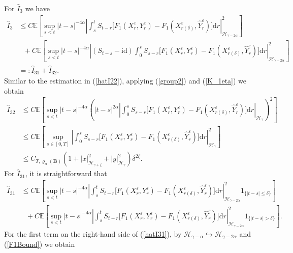 \documentclass[10pt,a4paper]{article}
\numberwithin{equation}{section}
\begin{document}
For $\hat{I}_3$ we have
\begin{align*}
\hat{I}_3 & \leq C   \mathbb E \left [ \sup_{s<t} |t-s|^{-4\alpha} \left| \int_s^t S_{t-r}\big[ F_1(X_r^\varepsilon,Y_r^\varepsilon)-F_1(X_{r(\delta)}^\varepsilon,\hat{Y}_r^\varepsilon) \big]\mathrm{d} r \right|_{\mathcal H_{\gamma-2\alpha} }^2 \right ] \nonumber\\
	&~~~+C \mathbb E \left [ \sup_{s<t} |t-s|^{-4\alpha} \left| (S_{t-s}-\mathrm{\mathrm{id} })\int_0^s S_{s-r}\big[F_1(X_r^\varepsilon,Y_r^\varepsilon)-F_1(X_{r(\delta)}^\varepsilon,\hat{Y}_r^\varepsilon) \big] \mathrm{d} r \right|_{\mathcal H_{\gamma-2\alpha} }^2 \right ] \nonumber\\
	&=: \hat{I}_{31}+\hat{I}_{32}.	
\end{align*}
Similar to the estimation in (\ref{hatI22}), applying (\ref{group2}) and (\ref{K_1eta}) we obtain
\begin{align}\label{hatI32}
\hat{I}_{32} &\leq C \mathbb E \left [ \sup_{s<t} |t-s|^{-4\alpha} \left( |t-s|^{2\alpha} \left| \int_0^s S_{s-r}\big[F_1(X_r^\varepsilon,Y_r^\varepsilon)-F_1(X_{r(\delta)}^\varepsilon,\hat{Y}_r^\varepsilon) \big] \mathrm{d} r \right|_{\mathcal H_\gamma } \right)^2 \right ] \nonumber\\
&\leq C \mathbb E \left [ \sup_{s \in [0,T]}  \left| \int_0^s S_{s-r}\big[F_1(X_r^\varepsilon,Y_r^\varepsilon)-F_1(X_{r(\delta)}^\varepsilon,\hat{Y}_r^\varepsilon) \big] \mathrm{d} r \right|_{\mathcal H_{\gamma} }^2\right ] \nonumber\\
& \leq C_{T,\varrho_{\alpha}(\mathbf{B})} (1+|x|_{\mathcal{H}_{\gamma+\zeta}}^2+|y|_{\mathcal{H}_\gamma}^2)\delta^{2\zeta}.
\end{align}
For $\hat{I}_{31}$, it is straightforward that
\begin{align}\label{hatI31}
\hat{I}_{31}
	&\leq C   \mathbb E \left [ \sup_{s<t} |t-s|^{-4\alpha} \left| \int_s^t S_{t-r}\big[ F_1(X_r^\varepsilon,Y_r^\varepsilon)-F_1(X_{r(\delta)}^\varepsilon,\hat{Y}_r^\varepsilon) \big]\mathrm{d} r \right|_{\mathcal H_{\gamma-2\alpha} }^2  1_{ \{|t-s|\leq \delta\}}\right ] \nonumber\\
	&~~~+C   \mathbb E \left [ \sup_{s<t} |t-s|^{-4\alpha} \left| \int_s^t S_{t-r}\big[ F_1(X_r^\varepsilon,Y_r^\varepsilon)-F_1(X_{r(\delta)}^\varepsilon,\hat{Y}_r^\varepsilon) \big]\mathrm{d} r \right|_{\mathcal H_{\gamma-2\alpha} }^2  1_{ \{|t-s| >\delta\}}\right ] .
\end{align}
For the first term on the right-hand side of (\ref{hatI31}), by $\mathcal H_{\gamma-\alpha} \hookrightarrow \mathcal H_{\gamma-2\alpha}$ and (\ref{F1Bound}) we obtain
\end{document}
